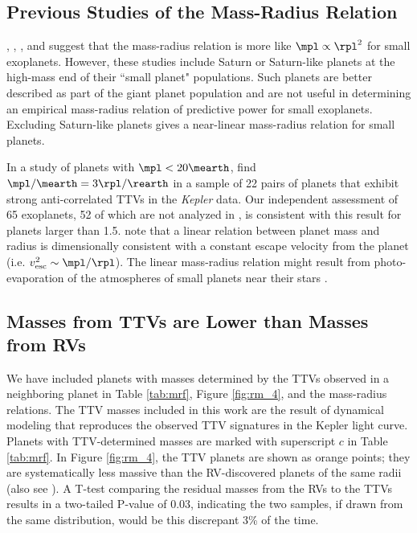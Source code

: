 \subsection{Previous Studies of the Mass-Radius Relation}
\citet{Lissauer2011}, \citet{Enoch2012}, \citet{Kane2012}, and \citet{Weiss2013} suggest that the mass-radius relation is more like $\mpl \propto \rpl^2$ for small exoplanets.  However, these studies include Saturn or Saturn-like planets at the high-mass end of their ``small planet" populations.  Such planets are better described as part of the giant planet population and are not useful in determining an empirical mass-radius relation of predictive power for small exoplanets.  Excluding Saturn-like planets gives a near-linear mass-radius relation for small planets.

In a study of planets with $\mpl < 20\mearth$, \citet{WL2013} find $\mpl/\mearth = 3 \rpl/\rearth$ in a sample of 22 pairs of planets that exhibit strong anti-correlated TTVs in the \textit{Kepler} data.  Our independent assessment of 65 exoplanets, 52 of which are not analyzed in \citet{WL2013}, is consistent with this result for planets larger than 1.5\rearth.  \citet{WL2013} note that a linear relation between planet mass and radius is dimensionally consistent with a constant escape velocity from the planet (i.e. $v_{\mathrm{esc}}^2 \sim \mpl/\rpl$).  The linear mass-radius relation might result from photo-evaporation of the atmospheres of small planets near their stars \citep{Lopez2012}.

\subsection{Masses from TTVs are Lower than Masses from RVs}
We have included planets with masses determined by the TTVs observed in a neighboring planet in Table \ref{tab:mrf}, Figure \ref{fig:rm_4}, and the mass-radius relations.  The TTV masses included in this work are the result of dynamical modeling that reproduces the observed TTV signatures in the Kepler light curve.  Planets with TTV-determined masses are marked with superscript $c$ in Table \ref{tab:mrf}.  In Figure \ref{fig:rm_4}, the TTV planets are shown as orange points; they are systematically less massive than the RV-discovered planets of the same radii (also see \citet{Jontof-Hutter2013}).  A T-test comparing the residual masses from the RVs to the TTVs results in a two-tailed P-value of 0.03, indicating the two samples, if drawn from the same distribution, would be this discrepant 3\% of the time.

